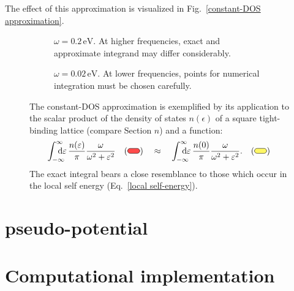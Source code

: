 The effect of this approximation is visualized in Fig.~\ref{constant-DOS
approximation}.

\begin{figure}
    \small
    \begin{subfigure}{6.75cm}
        
        \caption{$\omega = 0.2\,\mathrm{eV}$. At higher frequencies, exact and
                 approximate integrand may differ considerably.}
    \end{subfigure}%
    \hfill%
    \begin{subfigure}{6.75cm}
        
        \caption{$\omega = 0.02\,\mathrm{eV}$. At lower frequencies, points for
                 numerical integration must be chosen carefully.}
    \end{subfigure}
    \captionsetup{singlelinecheck=off}
    \caption[Constant-DOS approximation]{ %
        The constant-DOS approximation is exemplified by its application to the
        scalar product of the density of states $n(\epsilon)$ of a square
        tight-binding lattice (compare Section $n$) and a 
        function:
        \begin{align*}
            \int \from{-\infty} \till \infty
            \D \epsilon \, \frac {n(\epsilon)} \pi
            \frac \omega {\omega^2 + \epsilon^2}
            \quad
            (\tikz \draw [fill=red!70!white, rounded corners=3pt]
                (0, 0) rectangle (0.5, 0.2);)
            \quad \approx \quad
            \int \from{-\infty} \till \infty
            \D \epsilon \, \frac {n(0)} \pi
            \frac \omega {\omega^2 + \epsilon^2}.
            \quad
            (\tikz \draw [fill=yellow!60!white, rounded corners=3pt]
                (0, 0) rectangle (0.5, 0.2);)
        \end{align*}
        The exact integral bears a close resemblance to those which occur in the
        local self energy (Eq.~\ref{local self-energy}).
        }
    \label{constant-DOS approximation}
\end{figure}

\section{ pseudo-potential}

\section{Computational implementation}
